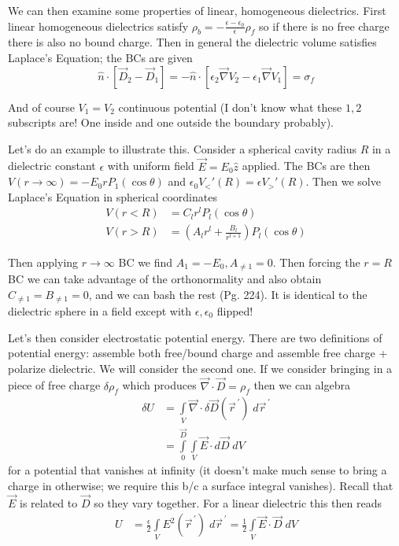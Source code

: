 \documentclass[10pt]{report}
\newcommand{\pvec}[1]{\vec{#1}^{\,\prime}}
\begin{document}
We can then examine some properties of linear, homogeneous dielectrics. First linear homogeneous dielectrics satisfy $\rho_b = -\frac{\epsilon - \epsilon_0}{\epsilon}\rho_f$ so if there is no free charge there is also no bound charge. Then in general the dielectric volume satisfies Laplace's Equation; the BCs are given 
\begin{equation}
    \hat{n} \cdot \left[ \vec{D}_2 - \vec{D}_1 \right] = -\hat{n}\cdot\left[ \epsilon_2\vec{\nabla}V_2 - \epsilon_1\vec{\nabla}V_1 \right] = \sigma_f
\end{equation}

And of course $V_1 = V_2$ continuous potential (I don't know what these $1,2$ subscripts are! One inside and one outside the boundary probably).

Let's do an example to illustrate this. Consider a spherical cavity radius $R$ in a dielectric constant $\epsilon$ with uniform field $\vec{E} = E_0\hat{z}$ applied. The BCs are then $V(r \to \infty) = -E_0rP_1(\cos\theta)$ and $\epsilon_0 V_<'(R) = \epsilon V_>'(R)$. Then we solve Laplace's Equation in spherical coordinates
\begin{align}
    V(r < R) &= C_l r^lP_l(\cos\theta)\\
    V(r > R) &= \left(A_lr^l + \frac{B_l}{r^{l+1}}\right)P_l(\cos\theta)
\end{align}

Then applying $r \to \infty$ BC we find $A_1 = -E_0, A_{\neq 1} = 0$. Then forcing the $r=R$ BC we can take advantage of the orthonormality and also obtain $C_{\neq 1} = B_{\neq 1} = 0$, and we can bash the rest (Pg. 224). It is identical to the dielectric sphere in a field except with $\epsilon, \epsilon_0$ flipped!

Let's then consider electrostatic potential energy. There are two definitions of potential energy: assemble both free/bound charge and assemble free charge + polarize dielectric. We will consider the second one. If we consider bringing in a piece of free charge $\delta \rho_f$ which produces $\vec{\nabla}\cdot \vec{D} = \rho_f$ then we can algebra
\begin{align}
    \delta U &= \displaystyle\int\limits_{V}^{}\vec{\nabla}\cdot \delta \vec{D}(\pvec{r})\;d\pvec{r}\\
    &= \displaystyle\int\limits_{0}^{\vec{D}}\displaystyle\int\limits_{V}^{}\vec{E}\cdot d\vec{D}\;dV
\end{align}
for a potential that vanishes at infinity (it doesn't make much sense to bring a charge in otherwise; we require this b/c a surface integral vanishes). Recall that $\vec{E}$ is related to $\vec{D}$ so they vary together. For a linear dielectric this then reads 
\begin{align}
    U &= \frac{\epsilon}{2}\displaystyle\int\limits_{V}^{}E^2(\pvec{r})\;d\pvec{r} = \frac{1}{2}\displaystyle\int\limits_{V}^{}\vec{E}\cdot \vec{D}\;dV
\end{align}
\end{document}
